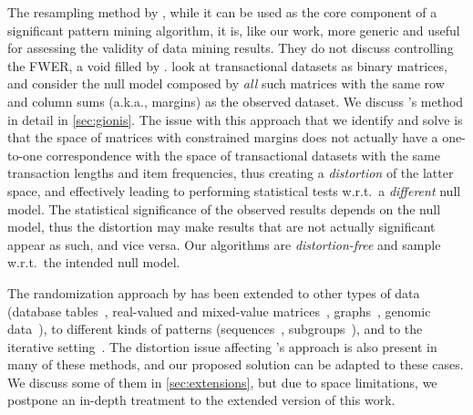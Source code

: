 The resampling method by \citet{GionisMMT07}, while it can be used as the  core
component of a significant pattern mining algorithm, it is, like our work, more
generic and useful for assessing the validity of data mining results. They
do not discuss controlling the FWER, a void filled by \citet{Hanhijarvi11}.
\citet{GionisMMT07} look at transactional datasets as binary matrices, and
consider the null model composed by \emph{all} such matrices with the same row
and column sums (a.k.a., margins) as the observed dataset. We discuss
\citet{GionisMMT07}'s method in detail in \cref{sec:gionis}. The issue with this
approach that we identify and solve is that the space of matrices with
constrained margins does not actually have a one-to-one correspondence with the
space of transactional datasets with the same transaction lengths and item
frequencies, thus creating a \emph{distortion} of the latter space, and
effectively leading to performing statistical tests w.r.t.\ a \emph{different}
null model. The statistical significance of the observed results depends on the
null model, thus the distortion may make results that are not actually
significant appear as such, and vice versa. Our algorithms are
\emph{distortion-free} and sample w.r.t.\ the intended null model.

The randomization approach by \citet{GionisMMT07} has been extended to other
types of data (database tables~\citep{OjalaGGM10}, real-valued and mixed-value
matrices~\citep{OjalaVKHM08,Ojala10},
graphs~\citep{HanhijarviGP09,GunnemannDJE12}, genomic
data~\citep{FerkingstadHS15}), to different kinds of patterns
(sequences~\citep{TononV19}, subgroups~\citep{DuivesteijnK11}), and to the
iterative setting~\citep{HanhijarviOVPTM09}.  The  distortion issue affecting
\citet{GionisMMT07}'s approach is also present in many of these methods, and our
proposed solution can be adapted to these cases. We discuss some of them in
\cref{sec:extensions}, but due to space limitations, we postpone an in-depth
treatment to the extended version of this work.
